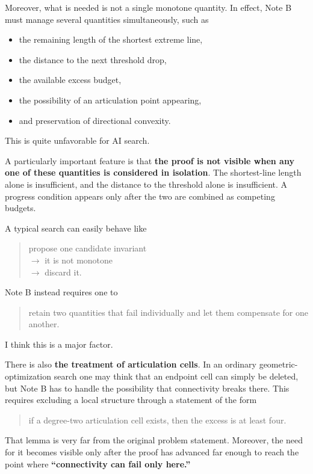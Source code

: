 \documentclass[11pt,a4paper]{article}
\begin{document}
Moreover, what is needed is not a single monotone quantity. In effect, Note B must manage several quantities simultaneously, such as

\begin{itemize}[leftmargin=2em]
\item the remaining length of the shortest extreme line,
\item the distance to the next threshold drop,
\item the available excess budget,
\item the possibility of an articulation point appearing,
\item and preservation of directional convexity.
\end{itemize}

This is quite unfavorable for AI search.

A particularly important feature is that \textbf{the proof is not visible when any one of these quantities is considered in isolation}. The shortest-line length alone is insufficient, and the distance to the threshold alone is insufficient. A progress condition appears only after the two are combined as competing budgets.

A typical search can easily behave like

\begin{quote}
propose one candidate invariant\\
$\to$ it is not monotone\\
$\to$ discard it.
\end{quote}

Note B instead requires one to

\begin{quote}
retain two quantities that fail individually and let them compensate for one another.
\end{quote}

I think this is a major factor.

There is also \textbf{the treatment of articulation cells}. In an ordinary geometric-optimization search one may think that an endpoint cell can simply be deleted, but Note B has to handle the possibility that connectivity breaks there. This requires excluding a local structure through a statement of the form

\begin{quote}
if a degree-two articulation cell exists, then the excess is at least four.
\end{quote}

That lemma is very far from the original problem statement. Moreover, the need for it becomes visible only after the proof has advanced far enough to reach the point where \textbf{``connectivity can fail only here.''}
\end{document}
